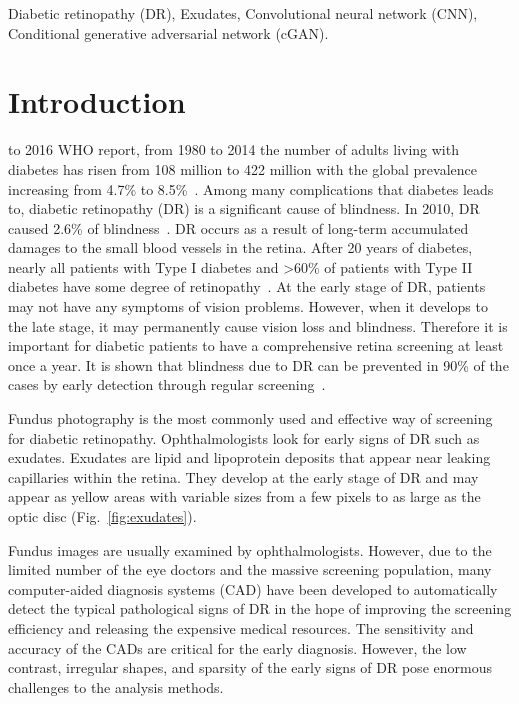 \documentclass{osa-article}
\begin{document}
\begin{keywords}
Diabetic retinopathy (DR), Exudates, Convolutional neural network (CNN), Conditional generative adversarial network (cGAN).
\end{keywords}


\section{Introduction}
 to 2016 WHO report, from 1980 to 2014 the number of adults living with diabetes has risen from 108 million to 422 million with the global prevalence increasing from 4.7\% to 8.5\%~\cite{mathers2006projections}. Among many complications that diabetes leads to, diabetic retinopathy (DR) is a significant cause of blindness. In 2010, DR caused 2.6\% of blindness~\cite{bourne2013causes}. DR occurs as a result of long-term accumulated damages to the small blood vessels in the retina. After 20 years of diabetes, nearly all patients with Type I diabetes and >60\% of patients with Type II diabetes have some degree of retinopathy~\cite{sirhindidiabetic}. At the early stage of DR, patients may not have any symptoms of vision problems. However, when it develops to the late stage, it may permanently cause vision loss and blindness. Therefore it is important for diabetic patients to have a comprehensive retina screening at least once a year. It is shown that blindness due to DR can be prevented in 90\% of the cases by early detection through regular screening~\cite{tapp2003prevalence}.

Fundus photography is the most commonly used and effective way of screening for diabetic retinopathy. Ophthalmologists look for early signs of DR such as exudates. Exudates are lipid and lipoprotein deposits that appear near leaking capillaries within the retina. They develop at the early stage of DR and may appear as yellow areas with variable sizes from a few pixels to as large as the optic disc (Fig.~\ref{fig:exudates}).

Fundus images are usually examined by ophthalmologists. However, due to the limited number of the eye doctors and the massive screening population, many computer-aided diagnosis systems (CAD) have been developed to automatically detect the typical pathological signs of DR in the hope of improving the screening efficiency and releasing the expensive medical resources. The sensitivity and accuracy of the CADs are critical for the early diagnosis. However, the low contrast, irregular shapes, and sparsity of the early signs of DR pose enormous challenges to the analysis methods.
\end{document}
